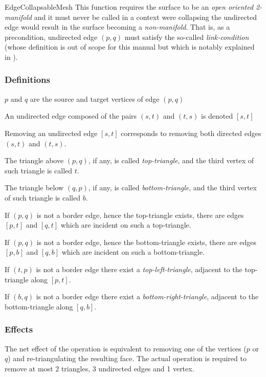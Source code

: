 \begin{ccRefConcept}{EdgeCollapsableMesh}
This function requires the surface to be an {\em open oriented 2-manifold} and it must
never be called in a context were collapsing the undirected edge would result in the surface 
becoming a {\em non-manifold}. That is, as a precondition, undirected edge $(p,q)$ must satisfy
the so-called {\em link-condition}
(whose definition is out of scope for this manual but which is notably explained 
in \cite{degn-tpec-98}).

\subsubsection*{Definitions}

$p$ and $q$ are the source and target vertices of edge $(p,q)$

An undirected edge composed of the pairs $(s,t)$ and $(t,s)$ is denoted $[s,t]$

Removing an undirected edge $[s,t]$ corresponds to removing both directed edges $(s,t)$ and $(t,s)$.

The triangle above $(p,q)$, if any, is called {\em top-triangle}, and the third vertex of
such triangle is called  $t$.

The triangle below $(q,p)$, if any, is called {\em bottom-triangle}, and the third vertex
of such triangle is called $b$.

If $(p,q)$ is not a border edge, hence the top-triangle exists, 
there are edges $[p,t]$ and $[q,t]$ which are incident on such a top-triangle.

If $(p,q)$ is not a border edge, hence the bottom-triangle exists, 
there are edges $[p,b]$ and $[q,b]$ which are incident on such a bottom-triangle.

If $(t,p)$ is not a border edge there exist a {\em top-left-triangle},
adjacent to the top-triangle along $[p,t]$.

If $(b,q)$ is not a border edge there exist a {\em bottom-right-triangle},
adjacent to the bottom-triangle along $[q,b]$.

\subsubsection*{Effects}

The net effect of the operation is equivalent to removing one of the vertices ($p$ or $q$)
and re-triangulating the resulting face. The actual operation is 
required to remove at most 2 triangles, 3 undirected edges and 1 vertex. 




\end{ccRefConcept}
